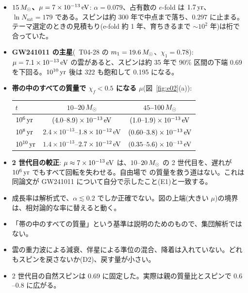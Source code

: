 \begin{result}
\begin{itemize}
\item \textbf{$15\,M_\odot$、$\mu=7\times10^{-13}\,\mathrm{eV}$}: $\alpha=0.079$、占有数の $e$-fold は $1.7\,\mathrm{yr}$、$\ln N_\mathrm{sat}=179$ である。スピンは約 300 年で中点まで落ち、$0.297$ に止まる。テーマ選定のときの見積もり(e-fold 約 1 年、育ちきるまで $\sim10^2$ 年)は桁で合っていた。
\item \textbf{GW241011 の主星}(\review\ T04-28 の $m_1=19.6\,M_\odot$、$\chi_1=0.78$): $\mu=7.1\times10^{-13}\,\mathrm{eV}$ の雲があると、スピンは約 35 年で 90\% 区間の下端 0.69 を下回る。$10^{10}\,\mathrm{yr}$ 後は $322$ も飽和して 0.195 になる。
\item \textbf{帯の中のすべての質量で $\chi_f<0.5$ になる $\mu$}(図~\ref{fig:e02}(a)):
  \begin{center}
  \begin{tabular}{@{}lcc@{}}
  \toprule
  $t$ & $10$--$20\,M_\odot$ & $45$--$100\,M_\odot$ \\
  \midrule
  $10^6\,\mathrm{yr}$ & $(4.0\text{--}8.9)\times10^{-13}\,\mathrm{eV}$ & $(1.0\text{--}1.9)\times10^{-13}\,\mathrm{eV}$ \\
  $10^8\,\mathrm{yr}$ & $2.4\times10^{-13}$--$1.8\times10^{-12}\,\mathrm{eV}$ & $(0.60\text{--}3.8)\times10^{-13}\,\mathrm{eV}$ \\
  $10^{10}\,\mathrm{yr}$ & $1.4\times10^{-13}$--$2.7\times10^{-12}\,\mathrm{eV}$ & $(0.35\text{--}5.6)\times10^{-13}\,\mathrm{eV}$ \\
  \bottomrule
  \end{tabular}
  \end{center}
\item \textbf{2 世代目の較正}: $\mu\approx7\times10^{-13}\,\mathrm{eV}$ は、$10$--$20\,M_\odot$ の 2 世代目を、遅れが $10^6\,\mathrm{yr}$ でもすべて回転を失わせる。自由場で  の質量を救う道はない。これは同論文が GW241011 について自分で示したこと(E1)と一致する。
\end{itemize}
\end{result}

\begin{caveat}
\begin{itemize}
\item 成長率は解析式で、$\alpha\lesssim0.2$ でしか正確でない。図の上端(大きい $\mu$)の境界は、相対論的な率に替えると動く。
\item 「帯の中のすべての質量」という基準は説明のためのもので、集団解析ではない。
\item 雲の重力波による減衰、伴星による準位の混合、降着は入れていない。どれもスピンを戻さないか(D2)、戻す量が小さい。
\item 2 世代目の自然スピンは 0.69 に固定した。実際は親の質量比とスピンで $0.6$--$0.8$ に広がる。
\end{itemize}
\end{caveat}

